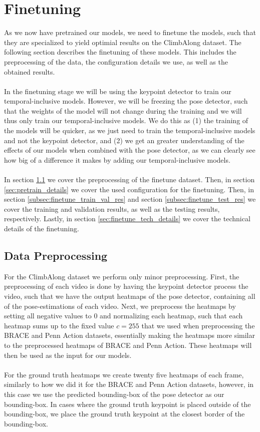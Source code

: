 \documentclass[./main.tex]{subfiles}
\begin{document}
\section{Finetuning}
\label{sec:finetuning}
As we now have pretrained our models, we need to finetune the models, such that they are specialized to yield optimial results on the ClimbAlong dataset. The following section describes the finetuning of these models. This includes the preprocessing of the data, the configuration details we use, as well as the obtained results.
\\
\\
In the finetuning stage we will be using the keypoint detector to train our temporal-inclusive models. However, we will be freezing the pose detector, such that the weights of the model will not change during the training and we will thus only train our temporal-inclusive models. We do this as (1) the training of the models will be quicker, as we just need to train the temporal-inclusive models and not the keypoint detector, and (2) we get an greater understanding of the effects of our models when combined with the pose detector, as we can clearly see how big of a difference it makes by adding our temporal-inclusive models.
\\
\\
In section \ref{sec:finetune_data_preprocessing} we cover the preprocessing of the finetune dataset. Then, in section \ref{sec:pretrain_details} we cover the used configuration for the finetuning. Then, in section \ref{subsec:finetune_train_val_res} and section \ref{subsec:finetune_test_res} we cover the training and validation results, as well as the testing results, respectively. Lastly, in section \ref{sec:finetune_tech_details} we cover the technical details of the finetuning.

\subsection{Data Preprocessing}
\label{sec:finetune_data_preprocessing}
For the ClimbAlong dataset we perform only minor preprocessing. First, the preprocessing of each video is done by having the keypoint detector process the video, such that we have the output heatmaps of the pose detector, containing all of the pose-estimations of each video. Next, we preprocess the heatmaps by setting all negative values to $0$ and normalizing each heatmap, such that each heatmap sums up to the fixed value $c = 255$ that we used when preprocessing the BRACE and Penn Action datasets, essentially making the heatmaps more similar to the preprocessed heatmaps of BRACE and Penn Action. These heatmaps will then be used as the input for our models.
\\
\\
For the ground truth heatmaps we create twenty five heatmaps of each frame, similarly to how we did it for the BRACE and Penn Action datasets, however, in this case we use the predicted bounding-box of the pose detector as our bounding-box. In cases where the ground truth keypoint is placed outside of the bounding-box, we place the ground truth keypoint at the closest border of the bounding-box.
\end{document}
